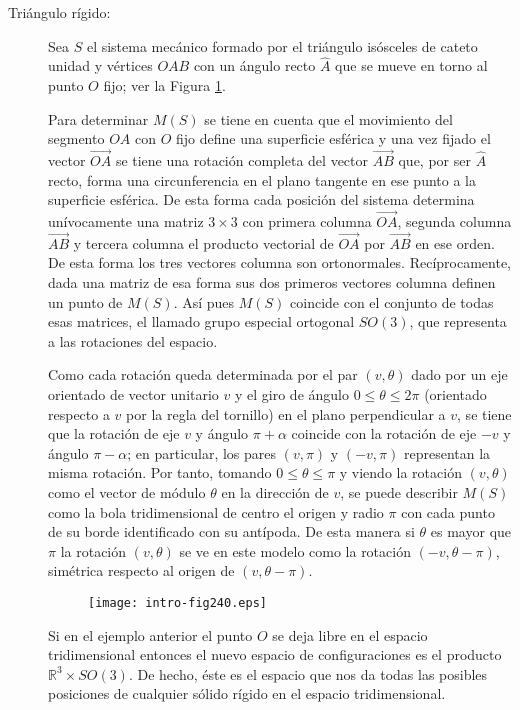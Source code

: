 \documentclass[../VD.tex]{subfiles}
\begin{document}
\begin{description}
\item[Triángulo rígido:] Sea $S$ el sistema mecánico formado por el triángulo
  isósceles de cateto unidad y vértices $OAB$ con un ángulo recto $\widehat{A}$
  que se mueve en torno al punto $O$ fijo; ver la Figura \ref{fig240}.

  Para determinar $M(S)$ se tiene en cuenta que el movimiento del segmento $OA$
  con $O$ fijo define una superficie esférica y una vez fijado el vector
  $\overrightarrow{OA}$ se tiene una rotación completa del vector
  $\overrightarrow{AB}$ que, por ser $\widehat{A}$ recto, forma una
  circunferencia en el plano tangente en ese punto a la superficie esférica. De
  esta forma cada posición del sistema determina unívocamente una matriz
  $3\times 3$ con primera columna $\overrightarrow{OA}$, segunda columna
  $\overrightarrow{AB}$ y tercera columna el producto vectorial de
  $\overrightarrow{OA}$ por $\overrightarrow{AB}$ en ese orden. De esta forma
  los tres vectores columna son ortonormales. Recíprocamente, dada una matriz de
  esa forma sus dos primeros vectores columna definen un punto de $M(S)$. Así
  pues $M(S)$ coincide con el conjunto de todas esas matrices, el llamado grupo
  especial ortogonal $SO(3)$, que representa a las rotaciones del espacio.

  Como cada rotación queda determinada por el par $(v,\theta)$ dado por un eje
  orientado de vector unitario $v$ y el giro de ángulo $0\leq \theta\leq 2\pi$
  (orientado respecto a $v$ por la regla del tornillo) en el plano perpendicular
  a $v$, se tiene que la rotación de eje $v$ y ángulo $\pi+\alpha$ coincide con
  la rotación de eje $-v$ y ángulo $\pi-\alpha$; en particular, los pares
  $(v,\pi)$ y $(-v,\pi)$ representan la misma rotación. Por tanto, tomando
  $0\leq \theta\leq \pi$ y viendo la rotación $(v,\theta)$ como el vector de
  módulo $\theta$ en la dirección de $v$, se puede describir $M(S)$ como la bola
  tridimensional de centro el origen y radio $\pi$ con cada punto de su borde
  identificado con su antípoda. De esta manera si $\theta$ es mayor que $\pi$ la
  rotación $(v,\theta)$ se ve en este modelo como la rotación $(-v,\theta-\pi)$,
  simétrica respecto al origen de $(v,\theta-\pi)$.

  \begin{figure}[ht]
    \centering
    \texttt{[image: intro-fig240.eps]} %
    \caption{}
    \label{fig240}
  \end{figure}

	Si en el ejemplo anterior el punto $O$ se deja libre en el espacio
  tridimensional entonces el nuevo espacio de configuraciones es el producto
  $\mathbb{R}^3\times SO(3)$. De hecho, éste es el espacio que nos da todas las
  posibles posiciones de cualquier sólido rígido en el espacio tridimensional.
\end{description}
  
\end{document}
